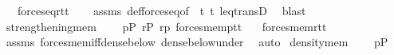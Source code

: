 \begin{isabellebody}
\ \ \ {\isachardoublequoteopen}forces{\isacharunderscore}{\kern0pt}eq{\isacharparenleft}{\kern0pt}r{\isacharcomma}{\kern0pt}t{}{\isacharcomma}{\kern0pt}t{}{\isacharparenright}{\kern0pt}{\isachardoublequoteclose}\isanewline
%
\isadelimproof
\ \ %
\endisadelimproof
%
\isatagproof
{}\isamarkupfalse%
\ assms\ def{\isacharunderscore}{\kern0pt}forces{\isacharunderscore}{\kern0pt}eq{\isacharbrackleft}{\kern0pt}of\ {\isacharunderscore}{\kern0pt}\ t{}\ t{}{\isacharbrackright}{\kern0pt}\ leq{\isacharunderscore}{\kern0pt}transD\ \isamarkupfalse%
\ blast%
\endisatagproof
{\isafoldproof}%
%
\isadelimproof
%
\endisadelimproof
%
\isadelimdocument
%
\endisadelimdocument
%
\isatagdocument
%
\isamarkuptrue%
%
\endisatagdocument
{\isafolddocument}%
%
\isadelimdocument
%
\endisadelimdocument
{}\isamarkupfalse%
\ strengthening{\isacharunderscore}{\kern0pt}mem{\isacharcolon}{\kern0pt}\ \isanewline
\ \ \ {\isachardoublequoteopen}p{\isasymin}P{\isachardoublequoteclose}\ {\isachardoublequoteopen}r{\isasymin}P{\isachardoublequoteclose}\ {\isachardoublequoteopen}r{\isasympreceq}p{\isachardoublequoteclose}\ {\isachardoublequoteopen}forces{\isacharunderscore}{\kern0pt}mem{\isacharparenleft}{\kern0pt}p{\isacharcomma}{\kern0pt}t{}{\isacharcomma}{\kern0pt}t{}{\isacharparenright}{\kern0pt}{\isachardoublequoteclose}\isanewline
\ \ \ {\isachardoublequoteopen}forces{\isacharunderscore}{\kern0pt}mem{\isacharparenleft}{\kern0pt}r{\isacharcomma}{\kern0pt}t{}{\isacharcomma}{\kern0pt}t{}{\isacharparenright}{\kern0pt}{\isachardoublequoteclose}\isanewline
%
\isadelimproof
\ \ %
\endisadelimproof
%
\isatagproof
{}\isamarkupfalse%
\ assms\ forces{\isacharunderscore}{\kern0pt}mem{\isacharunderscore}{\kern0pt}iff{\isacharunderscore}{\kern0pt}dense{\isacharunderscore}{\kern0pt}below\ dense{\isacharunderscore}{\kern0pt}below{\isacharunderscore}{\kern0pt}under\ \isamarkupfalse%
\ auto%
\endisatagproof
{\isafoldproof}%
%
\isadelimproof
%
\endisadelimproof
%
\isadelimdocument
%
\endisadelimdocument
%
\isatagdocument
%
\isamarkuptrue%
%
\endisatagdocument
{\isafolddocument}%
%
\isadelimdocument
%
\endisadelimdocument
{}\isamarkupfalse%
\ density{\isacharunderscore}{\kern0pt}mem{\isacharcolon}{\kern0pt}\ \isanewline
\ \ \ {\isachardoublequoteopen}p{\isasymin}P{\isachardoublequoteclose}\isanewline

\end{isabellebody}
